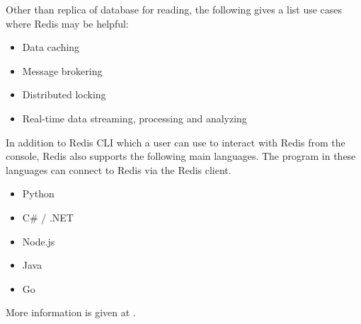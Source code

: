 Other than replica of database for reading, the following gives a list use cases where Redis may be helpful:
\begin{itemize}
	\item Data caching
	\item Message brokering
	\item Distributed locking
	\item Real-time data streaming, processing and analyzing
\end{itemize}

In addition to Redis CLI which a user can use to interact with Redis from the console, Redis also supports the following main languages. The program in these languages can connect to Redis via the Redis client.
\begin{itemize}
\item Python
\item C\# / .NET
\item Node.js
\item Java
\item Go
\end{itemize}
More information is given at \cite{redis2024client}.
